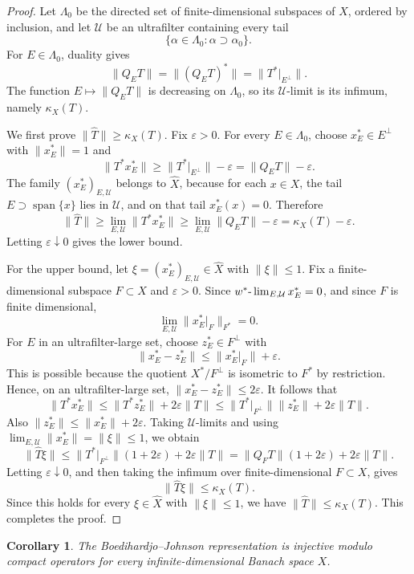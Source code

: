 \documentclass[11pt]{article}
\newtheorem{corollary}{Corollary}
\newcommand{\U}{\mathcal U}
\newcommand{\eps}{\varepsilon}
\begin{document}
\begin{proof}
Let \(\Lambda_0\) be the directed set of finite-dimensional subspaces of \(X\),
ordered by inclusion, and let \(\U\) be an ultrafilter containing every tail
\[
  \{\alpha\in\Lambda_0:\alpha\supset \alpha_0\}.
\]
For \(E\in\Lambda_0\), duality gives
\[
  \|Q_E T\|=\|(Q_E T)^*\|=\|T^*|_{E^\perp}\|.
\]
The function \(E\mapsto\|Q_E T\|\) is decreasing on \(\Lambda_0\), so its
\(\U\)-limit is its infimum, namely \(\kappa_X(T)\).

We first prove \(\|\widehat T\|\ge\kappa_X(T)\).  Fix \(\eps>0\).  For every
\(E\in\Lambda_0\), choose \(x_E^*\in E^\perp\) with \(\|x_E^*\|=1\) and
\[
  \|T^*x_E^*\|\ge \|T^*|_{E^\perp}\|-\eps
  =\|Q_E T\|-\eps.
\]
The family \((x_E^*)_{E,\U}\) belongs to \(\widehat X\), because for each
\(x\in X\), the tail \(E\supset \operatorname{span}\{x\}\) lies in \(\U\), and
on that tail \(x_E^*(x)=0\).  Therefore
\[
  \|\widehat T\|
  \ge \lim_{E,\U}\|T^*x_E^*\|
  \ge \lim_{E,\U}\|Q_E T\|-\eps
  =\kappa_X(T)-\eps.
\]
Letting \(\eps\downarrow0\) gives the lower bound.

For the upper bound, let
\(\xi=(x_E^*)_{E,\U}\in\widehat X\) with \(\|\xi\|\le1\).  Fix a
finite-dimensional subspace \(F\subset X\) and \(\eps>0\).  Since
\(w^*\hbox{-}\lim_{E,\U}x_E^*=0\), and since \(F\) is finite dimensional,
\[
  \lim_{E,\U}\|x_E^*|_F\|_{F^*}=0.
\]
For \(E\) in an ultrafilter-large set, choose \(z_E^*\in F^\perp\) with
\[
  \|x_E^*-z_E^*\|\le \|x_E^*|_F\|+\eps.
\]
This is possible because the quotient \(X^*/F^\perp\) is isometric to
\(F^*\) by restriction.  Hence, on an ultrafilter-large set,
\(\|x_E^*-z_E^*\|\le 2\eps\).  It follows that
\[
  \|T^*x_E^*\|
  \le \|T^*z_E^*\|+2\eps\|T\|
  \le \|T^*|_{F^\perp}\|\|z_E^*\|+2\eps\|T\|.
\]
Also \(\|z_E^*\|\le \|x_E^*\|+2\eps\).  Taking \(\U\)-limits and using
\(\lim_{E,\U}\|x_E^*\|=\|\xi\|\le1\), we obtain
\[
  \|\widehat T\xi\|
  \le \|T^*|_{F^\perp}\|(1+2\eps)+2\eps\|T\|
  =\|Q_FT\|(1+2\eps)+2\eps\|T\|.
\]
Letting \(\eps\downarrow0\), and then taking the infimum over
finite-dimensional \(F\subset X\), gives
\[
  \|\widehat T\xi\|\le \kappa_X(T).
\]
Since this holds for every \(\xi\in\widehat X\) with \(\|\xi\|\le1\), we have
\(\|\widehat T\|\le\kappa_X(T)\).  This completes the proof.
\end{proof}

\begin{corollary}
The Boedihardjo--Johnson representation is injective modulo compact operators
for every infinite-dimensional Banach space \(X\).
\end{corollary}
\end{document}
